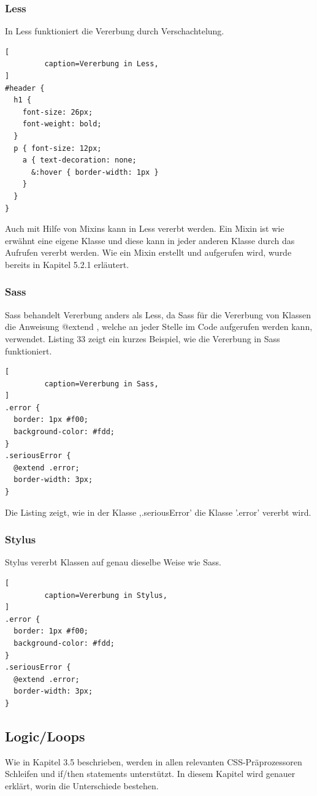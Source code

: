 \subsubsection{Less}
In Less funktioniert die Vererbung durch Verschachtelung.
\begin{lstlisting}[
         caption=Vererbung in Less,
]
#header {
  h1 {
    font-size: 26px;
    font-weight: bold;
  }
  p { font-size: 12px;
    a { text-decoration: none;
      &:hover { border-width: 1px }
    }
  }
}
\end{lstlisting}
Auch mit Hilfe von Mixins kann in Less vererbt werden. Ein Mixin ist wie erwähnt eine eigene Klasse und diese kann in jeder anderen Klasse durch das Aufrufen vererbt werden. Wie ein Mixin erstellt und aufgerufen wird, wurde bereits in Kapitel 5.2.1 erläutert.
\subsubsection{Sass}
Sass behandelt Vererbung anders als Less, da Sass für die Vererbung von Klassen die Anweisung \glqq{}@extend \grqq{}, welche an jeder Stelle im Code aufgerufen werden kann, verwendet. Listing 33 zeigt ein kurzes Beispiel, wie die Vererbung in Sass funktioniert.
\begin{lstlisting}[
         caption=Vererbung in Sass,
]
.error {
  border: 1px #f00;
  background-color: #fdd;
}
.seriousError {
  @extend .error;
  border-width: 3px;
}
\end{lstlisting}
Die Listing zeigt, wie in der Klasse ,.seriousError' die Klasse '.error' vererbt wird.
\subsubsection{Stylus}
Stylus vererbt Klassen auf genau dieselbe Weise wie Sass. 
\begin{lstlisting}[
         caption=Vererbung in Stylus,
]
.error {
  border: 1px #f00;
  background-color: #fdd;
}
.seriousError {
  @extend .error;
  border-width: 3px;
}
\end{lstlisting}
\subsection{Logic/Loops}
Wie in Kapitel 3.5 beschrieben, werden in allen relevanten CSS-Präprozessoren Schleifen und if/then statements unterstützt. \newline
In diesem Kapitel wird genauer erklärt, worin die Unterschiede bestehen.
